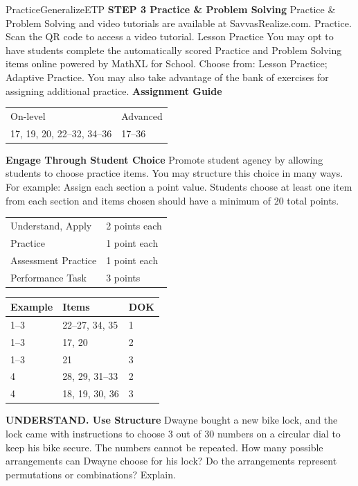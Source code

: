 \documentclass{article}
\newenvironment{item-analysis}{}{}      %
\newenvironment{practice}[2]{}{}        %
\newenvironment{te-addendum}[2]{}{}     %
\newcommand{\answer}[1]{}               %
\begin{document}
\begin{te-addendum}{Practice}{GeneralizeETP}
\textbf{STEP 3 Practice \& Problem Solving}
Practice \& Problem Solving and video tutorials are available at SavvasRealize.com. Practice.
Scan the QR code to access a video tutorial.
Lesson Practice You may opt to have students complete the automatically scored Practice and Problem Solving items online powered by MathXL for School.
Choose from: Lesson Practice; Adaptive Practice.
You may also take advantage of the bank of exercises for assigning additional practice.
\textbf{Assignment Guide}
\begin{tabular}{ll}
On-level & Advanced \\
17, 19, 20, 22--32, 34--36 & 17--36 \\
\end{tabular}
\textbf{Engage Through Student Choice}
Promote student agency by allowing students to choose practice items.
You may structure this choice in many ways.
For example:
Assign each section a point value. Students choose at least one item from each section and items chosen should have a minimum of 20 total points.
\begin{tabular}{ll}
Understand, Apply & 2 points each \\
Practice & 1 point each \\
Assessment Practice & 1 point each \\
Performance Task & 3 points \\
\end{tabular}
\end{te-addendum}
\begin{item-analysis}
\begin{tabular}{lll}
\toprule
Example & Items & DOK \\
\midrule
1--3 & 22--27, 34, 35 & 1 \\
1--3 & 17, 20 & 2 \\
1--3 & 21 & 3 \\
4 & 28, 29, 31--33 & 2 \\
4 & 18, 19, 30, 36 & 3 \\
\bottomrule
\end{tabular}
\end{item-analysis}
\begin{practice}{17}{2}
\textbf{UNDERSTAND. Use Structure} Dwayne bought a new bike lock, and the lock came with instructions to choose 3 out of 30 numbers on a circular dial to keep his bike secure. The numbers cannot be repeated. How many possible arrangements can Dwayne choose for his lock? Do the arrangements represent permutations or combinations? Explain.
\answer{24,360; the arrangements are permutations because locks are specific, and if you enter the numbers in the wrong order, locks will not open.}
\end{practice}
\end{document}
